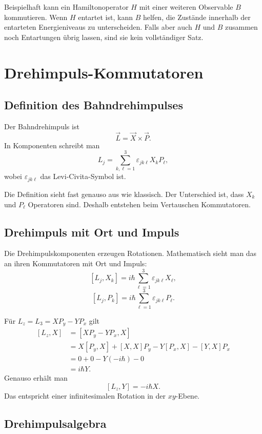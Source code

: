 Beispielhaft kann ein Hamiltonoperator $H$ mit einer weiteren Observable $B$ kommutieren. Wenn $H$ entartet ist, kann $B$ helfen, die Zustände innerhalb der entarteten Energieniveaus zu unterscheiden. Falls aber auch $H$ und $B$ zusammen noch Entartungen übrig lassen, sind sie kein vollständiger Satz.

\section{Drehimpuls-Kommutatoren}

\subsection{Definition des Bahndrehimpulses}

Der Bahndrehimpuls ist
\[
    \vec L=\vec X\times\vec P.
\]
In Komponenten schreibt man
\[
    L_j=\sum_{k,\ell=1}^3\varepsilon_{jk\ell}X_kP_\ell,
\]
wobei $\varepsilon_{jk\ell}$ das Levi-Civita-Symbol ist.

\begin{notebox}
Die Definition sieht fast genauso aus wie klassisch. Der Unterschied ist, dass $X_k$ und $P_\ell$ Operatoren sind. Deshalb entstehen beim Vertauschen Kommutatoren.
\end{notebox}

\subsection{Drehimpuls mit Ort und Impuls}

Die Drehimpulskomponenten erzeugen Rotationen. Mathematisch sieht man das an ihren Kommutatoren mit Ort und Impuls:
\[
    [L_j,X_k]=i\hbar\sum_{\ell=1}^3\varepsilon_{jk\ell}X_\ell,
\]
\[
    [L_j,P_k]=i\hbar\sum_{\ell=1}^3\varepsilon_{jk\ell}P_\ell.
\]

\begin{examplebox}
Für $L_z=L_3=XP_y-YP_x$ gilt
\[
\begin{aligned}
    [L_z,X]
    &=[XP_y-YP_x,X] \\
    &=X[P_y,X]+[X,X]P_y-Y[P_x,X]-[Y,X]P_x \\
    &=0+0-Y(-i\hbar)-0 \\
    &=i\hbar Y.
\end{aligned}
\]
Genauso erhält man
\[
    [L_z,Y]=-i\hbar X.
\]
Das entspricht einer infinitesimalen Rotation in der $xy$-Ebene.
\end{examplebox}

\subsection{Drehimpulsalgebra}

